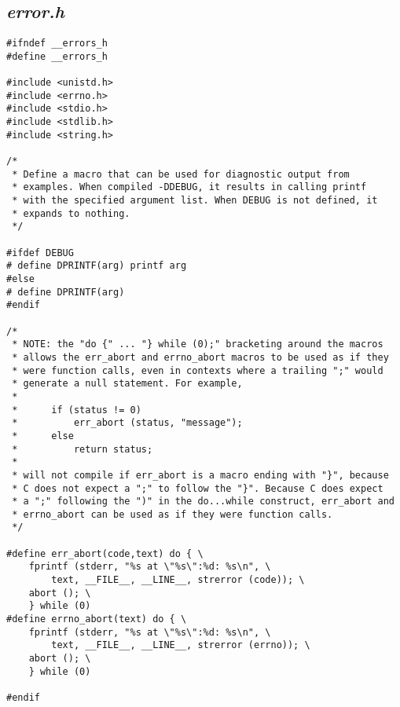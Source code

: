 \documentclass[11pt]{article}
\begin{document}
	\subsection{\emph{error.h}}
\lstset{language=C}        
\begin{lstlisting} 
#ifndef __errors_h
#define __errors_h

#include <unistd.h>
#include <errno.h>
#include <stdio.h>
#include <stdlib.h>
#include <string.h>

/*
 * Define a macro that can be used for diagnostic output from
 * examples. When compiled -DDEBUG, it results in calling printf
 * with the specified argument list. When DEBUG is not defined, it
 * expands to nothing.
 */
 
#ifdef DEBUG
# define DPRINTF(arg) printf arg
#else
# define DPRINTF(arg)
#endif

/*
 * NOTE: the "do {" ... "} while (0);" bracketing around the macros
 * allows the err_abort and errno_abort macros to be used as if they
 * were function calls, even in contexts where a trailing ";" would
 * generate a null statement. For example,
 *
 *      if (status != 0)
 *          err_abort (status, "message");
 *      else
 *          return status;
 *
 * will not compile if err_abort is a macro ending with "}", because
 * C does not expect a ";" to follow the "}". Because C does expect
 * a ";" following the ")" in the do...while construct, err_abort and
 * errno_abort can be used as if they were function calls.
 */
 
#define err_abort(code,text) do { \
    fprintf (stderr, "%s at \"%s\":%d: %s\n", \
        text, __FILE__, __LINE__, strerror (code)); \
    abort (); \
    } while (0)
#define errno_abort(text) do { \
    fprintf (stderr, "%s at \"%s\":%d: %s\n", \
        text, __FILE__, __LINE__, strerror (errno)); \
    abort (); \
    } while (0)

#endif
\end{lstlisting}	
\end{document}
